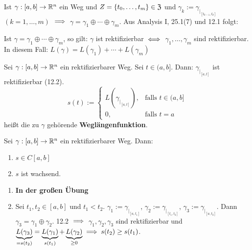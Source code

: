 \documentclass[a4paper,oneside,DIV15,BCOR12mm,chapterprefix=true,headings=onelinechapter]{scrbook}
\begin{document}
\begin{bemerkung}
Ist $\gamma:[a,b]\to\mathbb{R}^n$ ein Weg und $Z=\{t_0,\ldots,t_m\}\in\mathfrak{Z}$ und $\gamma_k:=\gamma_{|_{[t_{k-1},t_k]}}$ $(k=1,\ldots,m)$ $\implies$ $\gamma = \gamma_1 \oplus \cdots \oplus \gamma_m$. Aus Analysis I, 25.1(7) und 12.1 folgt: 
\end{bemerkung}

\begin{satz}
Ist $\gamma = \gamma_1 \oplus \cdots \oplus \gamma_m$, so gilt: $\gamma$ ist rektifizierbar $\iff$ $\gamma_1,\ldots,\gamma_m$ sind rektifizierbar. In diesem Fall: $L(\gamma)=L(\gamma_1) + \cdots + L(\gamma_m)$
\end{satz}

\begin{definition}
Sei $\gamma:[a,b]\to\mathbb{R}^n$ ein rektifizierbarer Weg. Sei $t\in(a,b]$. Dann: $\gamma_{|_{[a,t]}}$ ist rektifizierbar (12.2).
$$s(t):= \begin{cases}L(\gamma_{|_{[a,t]}}),&\text{falls }t\in(a,b] \\0, &\text{falls }t=a\end{cases}$$ heißt die zu $\gamma$ gehörende \textbf{Weglängenfunktion}.
\end{definition}

\begin{satz}
Sei $\gamma:[a,b]\to\mathbb{R}^n$ ein rektifizierbarer Weg. Dann: 
\begin{enumerate}
\item $s\in C[a,b]$
\item $s$ ist wachsend.
\end{enumerate}
\end{satz}

\begin{beweis}
\begin{enumerate}
\item \textbf{\color{red}In der großen Übung}
\item Sei $t_1, t_2 \in [a,b]$ und $t_1<t_2$. $\gamma_1:=\gamma_{|_{[a,t_1]}}$, $\gamma_2:=\gamma_{|_{[t_1,t_2]}}$, $\gamma_3:=\gamma_{|_{[a,t_2]}}$. Dann $\gamma_3 = \gamma_1 \oplus \gamma_2$. 12.2 $\implies$ $\gamma_1,\gamma_2,\gamma_3$ sind rektifizierbar und $\underbrace{L(\gamma_3)}_{=s(t_2)} = \underbrace{L(\gamma_1)}_{s(t_1)} + \underbrace{L(\gamma_2)}_{\ge 0} \implies s(t_2) \ge s(t_1)$.
\end{enumerate}
\end{beweis}
\end{document}
